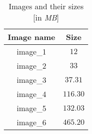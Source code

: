 \begin{table}[h]
\caption{Images and their sizes [in {\em MB}]}
\centering
\begin{tabular}{c c} 
\hline\hline
Image name & Size\\ [0.5ex] 
\hline 
image\_1 & $12$\\
image\_2 & $33$ \\
image\_3 & $37.31$ \\
image\_4 & $116.30$ \\
image\_5 & $132.03$\\ 
image\_6 & $465.20$\\
[1ex]
\hline
\end{tabular}
\label{table:imag_size} 
\end{table}
